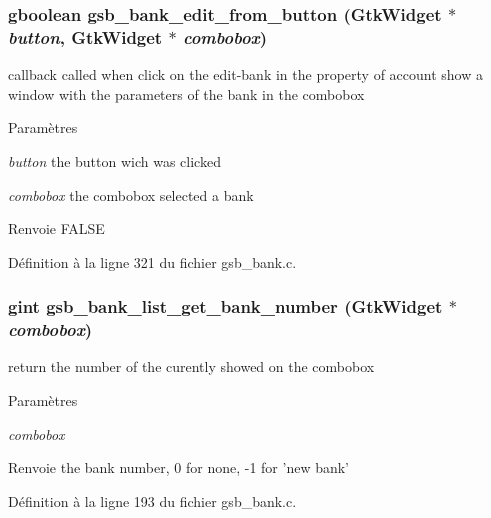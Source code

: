 \subsubsection[{gsb\_\-bank\_\-edit\_\-from\_\-button}]{\setlength{\rightskip}{0pt plus 5cm}gboolean gsb\_\-bank\_\-edit\_\-from\_\-button (GtkWidget $\ast$ {\em button}, \/  GtkWidget $\ast$ {\em combobox})}\label{gsb__bank_8c_ae61d311db2db4446a87481841f9b1424}
callback called when click on the edit-\/bank in the property of account show a window with the parameters of the bank in the combobox


\begin{DoxyParams}{Paramètres}
\item[{\em button}]the button wich was clicked \item[{\em combobox}]the combobox selected a bank\end{DoxyParams}
\begin{DoxyReturn}{Renvoie}
FALSE 
\end{DoxyReturn}


Définition à la ligne 321 du fichier gsb\_\-bank.c.

\subsubsection[{gsb\_\-bank\_\-list\_\-get\_\-bank\_\-number}]{\setlength{\rightskip}{0pt plus 5cm}gint gsb\_\-bank\_\-list\_\-get\_\-bank\_\-number (GtkWidget $\ast$ {\em combobox})}\label{gsb__bank_8c_af530b323e9bc34311e37d3795bddb807}
return the number of the curently showed on the combobox


\begin{DoxyParams}{Paramètres}
\item[{\em combobox}]\end{DoxyParams}
\begin{DoxyReturn}{Renvoie}
the bank number, 0 for none, -\/1 for 'new bank' 
\end{DoxyReturn}


Définition à la ligne 193 du fichier gsb\_\-bank.c.

